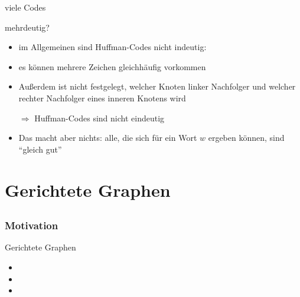 \begin{frame}{viele Codes}
	\begin{block}{mehrdeutig?}
    \begin{itemize}
      \item im Allgemeinen sind Huffman-Codes nicht indeutig:
		\item es können mehrere Zeichen gleichhäufig vorkommen
		\item Außerdem ist nicht festgelegt, welcher Knoten linker Nachfolger und welcher rechter Nachfolger eines inneren Knotens wird

		\item[$\Rightarrow$] Huffman-Codes sind nicht eindeutig
		\item Das macht aber nichts: alle, die sich für ein Wort $w$ ergeben können, sind "`gleich gut"'
	\end{itemize}
	\end{block}

\end{frame}


\section{Gerichtete Graphen}

\subsection*{}
\begin{frame}
	\frametitle{Motivation}

	\begin{block}{Gerichtete Graphen}
	\begin{itemize}
		\item {}
		\item {}
		\item {}
	\end{itemize}
	\end{block}


\end{frame}

